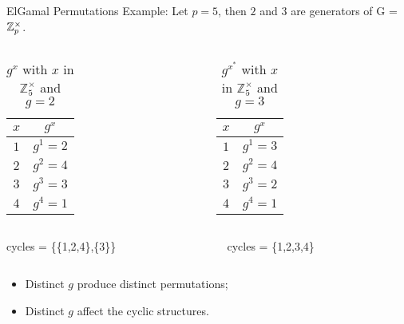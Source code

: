 \begin{frame}{ElGamal Permutations}
Example: Let $p =5$, then $2$ and $3$ are generators of G = $\mathbb{Z}_p^\times$.

      \begin{columns}
        \begin{column}{0.45\textwidth}
        \centering
            \begin{table}[]
    	    \begin{tabular}{c|c}
    	        $x$ & $g^{x} $ \\ \hline \hline
    	        $1$ & $g^{1} = 2$ \\
    	        $2$ & $g^{2} = 4$ \\
    	        $3$ & $g^{3} = 3$ \\
    	        $4$ & $g^{4} = 1$  
    	    \end{tabular}
    	    \caption{$g^{x}$ with $x$ in $\mathbb{Z}_5^\times$ and $g=2$}
    	    \label{tab:xmap1}
    	    \end{table}
        \end{column}
        \begin{column}{0.45\textwidth}
    	    \centering
            \begin{table}[]
    	    \begin{tabular}{c|c}
    	        $x$ & $g^{x} $ \\ \hline \hline
    	        $1$ & $g^{1} = 3$ \\
    	        $2$ & $g^{2} = 4$ \\
    	        $3$ & $g^{3} = 2$ \\
    	        $4$ & $g^{4} = 1$
    	    \end{tabular}
    	    \caption{$g^{x^*}$ with $x$ in $\mathbb{Z}_5^\times$ and $g=3$}
    	    \label{tab:xmap2}
    	    \end{table}
        \end{column}
  \end{columns}
        \begin{columns}
        \begin{column}{0.45\textwidth}
        \centering
            cycles = \{\{1,2,4\},\{3\}\}
        \end{column}
        \begin{column}{0.45\textwidth}
    	    \centering
            cycles = \{1,2,3,4\}
        \end{column}
  \end{columns}
  
  \pause
  \begin{itemize}
      \item Distinct $g$ produce distinct permutations;
      \item Distinct $g$ affect the cyclic structures.
  \end{itemize}
  
\end{frame}


